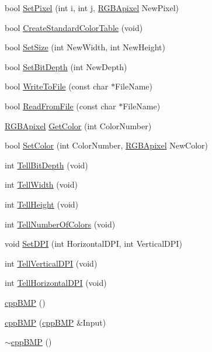 \begin{CompactItemize}
\item 
bool \hyperlink{classcpp_b_m_p_3d02d63c0abf0c87bb3698b26ac78dae}{SetPixel} (int i, int j, \hyperlink{struct_r_g_b_apixel}{RGBApixel} NewPixel)
\item 
bool \hyperlink{classcpp_b_m_p_2784c5b22510793c4f33bb9f566de4a7}{CreateStandardColorTable} (void)
\item 
bool \hyperlink{classcpp_b_m_p_9a6372827cbeb056c76f418bf764455d}{SetSize} (int NewWidth, int NewHeight)
\item 
bool \hyperlink{classcpp_b_m_p_4929652b47f073d3519b07fc05ed9eab}{SetBitDepth} (int NewDepth)
\item 
bool \hyperlink{classcpp_b_m_p_bee4a161c6d3ad3d627b70b62735259d}{WriteToFile} (const char $\ast$FileName)
\item 
bool \hyperlink{classcpp_b_m_p_b6b3269e3dc09cc5a9650578d5f5aa45}{ReadFromFile} (const char $\ast$FileName)
\item 
\hyperlink{struct_r_g_b_apixel}{RGBApixel} \hyperlink{classcpp_b_m_p_fa347d92080c6aa4870eb4b076d1aeba}{GetColor} (int ColorNumber)
\item 
bool \hyperlink{classcpp_b_m_p_954ee0b08e8b0e9455fe5c4a9e7a7181}{SetColor} (int ColorNumber, \hyperlink{struct_r_g_b_apixel}{RGBApixel} NewColor)
\item 
int \hyperlink{classcpp_b_m_p_95cf17f997cf74cbfaf889572bf7d751}{TellBitDepth} (void)
\item 
int \hyperlink{classcpp_b_m_p_539ec9582a0ebd2853d168eae6bfc68f}{TellWidth} (void)
\item 
int \hyperlink{classcpp_b_m_p_8dd563361efe9adc4bbe8ac88681811b}{TellHeight} (void)
\item 
int \hyperlink{classcpp_b_m_p_aef114087d702d456ef994bb64535e6e}{TellNumberOfColors} (void)
\item 
void \hyperlink{classcpp_b_m_p_96505f0e4666bd19d0c60e8eed948158}{SetDPI} (int HorizontalDPI, int VerticalDPI)
\item 
int \hyperlink{classcpp_b_m_p_809856c4aae1027fa37a7c3dd94d06c9}{TellVerticalDPI} (void)
\item 
int \hyperlink{classcpp_b_m_p_b0d8279d21b6890e9f7664bc46d4ff64}{TellHorizontalDPI} (void)
\item 
\hyperlink{classcpp_b_m_p_dd999f78c5b629a718c9ff82dca1b64a}{cppBMP} ()
\item 
\hyperlink{classcpp_b_m_p_97909a5d65342669eb673dc264600058}{cppBMP} (\hyperlink{classcpp_b_m_p}{cppBMP} \&Input)
\item 
\hyperlink{classcpp_b_m_p_ea62579b6a8a25449e108121de524019}{$\sim$cppBMP} ()

\end{CompactItemize}
